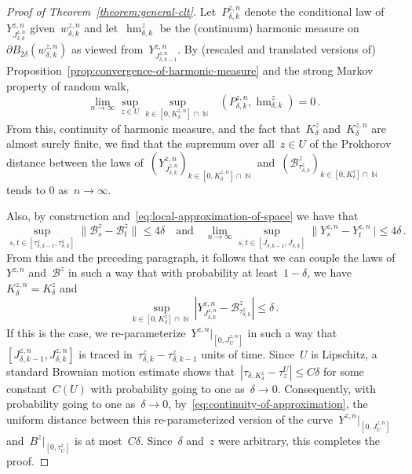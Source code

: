 \documentclass[12pt]{amsart}
\numberwithin{equation}{section}
\DeclareMathOperator{\N}{\mathbb{N}}
\DeclareMathOperator{\hm}{\mathop{hm}}
\DeclareMathOperator{\dPr}{\mathop{d^{Pr}}}
\begin{document}
\begin{proof}[Proof of Theorem~\ref{theorem:general-clt}]
	
	Let~$P_{\delta, k}^{z, n}$ denote the conditional law of~$Y^{z, n}_{J_{\delta,k}^{z, n}}$ given~$w_{\delta,k}^{z,n}$
	and let~$\hm_{\delta, k}^{z}$ be the (continuum) harmonic measure 
	on~$\partial B_{2 \delta}(w_{\delta, k}^{z, n})$ as viewed 
	from~$Y^{z, n}_{J_{\delta, k-1}^{z, n}}$.	By (rescaled and translated versions of) Proposition~\ref{prop:convergence-of-harmonic-measure} and the strong Markov property of random walk, 
	\[
	\lim_{n \to \infty} \sup_{z \in U} \sup_{k \in [0, K_{\delta}^{z, n}] \cap \N} \dPr \left( P_{\delta, k}^{z, n}, \hm_{\delta, k}^{z} \right) = 0 \, . 
	\]
	From this, continuity of harmonic measure, and the fact that~$K_{\delta}^z$ and~$K_{\delta}^{z, n}$ are almost surely finite, we find 
	that the supremum over all~$z \in U$ of the Prokhorov distance between the laws of~$\left( Y^{z, n}_{J_{\delta, k}^{z, n}} \right)_{k \in [0, K_{\delta}^{z, n}] \cap \N}$ and~$\left( \mathcal{B}^z_{\tau_{\delta, k}^{z}} \right)_{k \in [0, K_{\delta}^z] \cap \N}$ tends to 0 as~$n \to \infty$. 
	
	Also, by construction and~\eqref{eq:local-approximation-of-space} we have that 
	\begin{equation}
		\label{eq:continuity-of-approximation}
		\sup_{s, t \in [\tau^z_{\delta, k-1}, \tau^z_{\delta, k}]} \|\mathcal{B}_s^z - \mathcal{B}_t^z \| \leq 4 \delta
		\quad \mbox{and} \quad 
		\lim_{n \to \infty} \sup_{s, t \in [J_{\delta, k-1}, J_{\delta, k}]} \| Y_s^{z, n} - Y_t^{z, n} \ | \leq 4 \delta  \, . 
	\end{equation}
	From this and the preceding paragraph, it follows that we can couple the laws of~$Y^{z, n}$ and~$\mathcal{B}^z$
	in such a way that with probability at least~$1-\delta$, we have~$K_{\delta}^{z, n} = K_{\delta}^z$ and 
	\[
	\sup_{k \in [0, K_{\delta}^z] \cap \N} \left| Y^{z, n}_{J_{\delta, k}^{z, n}} - \mathcal{B}_{\tau_{\delta, k}^z}^z \right| \leq \delta \,. 
	\]
	If this is the case, we re-parameterize~$Y^{z, n} \vert_{[0, J_U^{z, n}]}$ in such a way that~$[J_{\delta, k-1}^{z, n}, J_{\delta, k}^{z, n}]$ is traced in~$\tau_{\delta, k}^z - \tau_{\delta, k-1}^z$ units of time.  {Since~$U$ is Lipschitz, a standard Brownian motion estimate
	 shows that~$|\tau_{\delta,K_{\delta}^z} - \tau_z^U| \leq C \delta$ for some constant~$C(U)$ with probability going to one as~$\delta \to 0$.}
	Consequently, with probability going to one as~$\delta \to 0$, by~\eqref{eq:continuity-of-approximation}, the uniform distance between this re-parameterized version of the curve~$Y^{z, n} \vert_{[0,J^{z, n}_U]}$ and~$B^{z} \vert_{[0, \tau^{z}_U]}$ is at most~$C \delta$. Since~$\delta$ and~$z$ were arbitrary, this completes  the proof. 
\end{proof}
\end{document}
